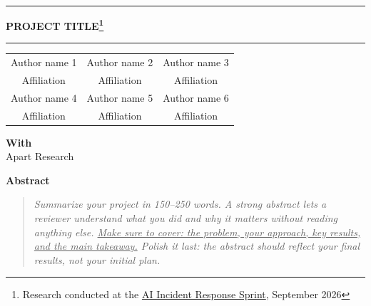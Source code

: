 \documentclass[11pt]{article}
\begin{document}
\noindent\rule{\linewidth}{1.1pt}
\begin{center}
  \vspace{0.6em}
  {\LARGE\bfseries PROJECT TITLE\footnote{Research conducted at the
  \href{https://apartresearch.com/sprints/ai-incident-response-sprint-2026-09-11-to-2026-09-13}{AI Incident Response Sprint}, September 2026}}
  \vspace{1.0em}
\end{center}
\noindent\rule{\linewidth}{1.1pt}
\vspace{1.2em}

\begin{center}
\begin{tabular}{ccc}
Author name 1 & Author name 2 & Author name 3 \\
Affiliation   & Affiliation   & Affiliation   \\[0.9em]
Author name 4 & Author name 5 & Author name 6 \\
Affiliation   & Affiliation   & Affiliation   \\[0.9em]
\end{tabular}

\vspace{0.3em}
\textbf{With}\\
Apart Research
\end{center}

\vspace{1.2em}
\begin{center}
{\large\bfseries Abstract}
\end{center}
\begin{quote}
\itshape
Summarize your project in 150--250 words. A strong abstract lets a reviewer understand what
you did and why it matters without reading anything else. \uline{Make sure to cover: the
problem, your approach, key results, and the main takeaway.} Polish it last: the abstract
should reflect your final results, not your initial plan.
\end{quote}
\end{document}
